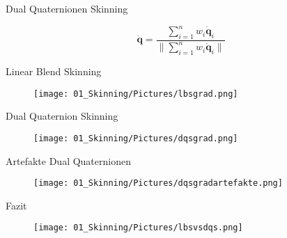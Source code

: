 		\begin{frame}{\Huge{Dual Quaternionen Skinning}}
			
			$$\mathbf{\dot q} =  \frac{\sum_{i=1}^n w_i \mathbf{\dot q}_i}{\| \sum_{i=1}^n w_i \mathbf{\dot q}_i \|}$$
			
			
		\end{frame}
		
				\begin{frame}{\Huge{Linear Blend Skinning}}
					
					\begin{figure}
						\texttt{[image: 01\_Skinning/Pictures/lbsgrad.png]}
					\end{figure}
					
					
					
				\end{frame}
				
						\begin{frame}{\Huge{Dual Quaternion Skinning}}
							
							\begin{figure}
								\texttt{[image: 01\_Skinning/Pictures/dqsgrad.png]}
							\end{figure}
							
							
							
						\end{frame}
						
				\begin{frame}{\Huge{Artefakte Dual Quaternionen}}
					
					\begin{figure}
						\texttt{[image: 01\_Skinning/Pictures/dqsgradartefakte.png]}
					\end{figure}
					
					
					
				\end{frame}
				
					\begin{frame}{\Huge{Fazit}}
							
							\begin{figure}
								\texttt{[image: 01\_Skinning/Pictures/lbsvsdqs.png]}
							\end{figure}
							
							
							
						\end{frame}